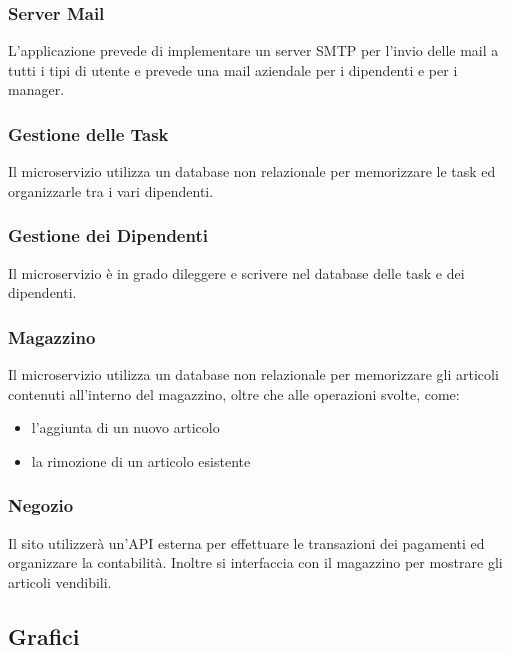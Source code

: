 \documentclass{report}
\begin{document}
\subsubsection*{Server Mail}
L'applicazione prevede di implementare un server SMTP per l’invio delle mail a tutti i tipi di utente e prevede una mail aziendale per i dipendenti e per i manager.

\subsubsection*{Gestione delle Task}
Il microservizio utilizza un database non relazionale per memorizzare le task ed organizzarle tra i vari dipendenti.

\subsubsection*{Gestione dei Dipendenti}
Il microservizio è in grado dileggere e scrivere nel database delle task e dei dipendenti.

\subsubsection*{Magazzino}
Il microservizio utilizza un database non relazionale per memorizzare gli articoli contenuti all’interno del magazzino, oltre che alle operazioni svolte, come:

\begin{itemize}
	\item l’aggiunta di un nuovo articolo
	
	\item la rimozione di un articolo esistente
\end{itemize}

\subsubsection*{Negozio}
Il sito utilizzerà un’API esterna per effettuare le transazioni dei pagamenti ed organizzare la contabilità. Inoltre si interfaccia con il magazzino per mostrare gli articoli vendibili.

\subsection{Grafici}
\end{document}
